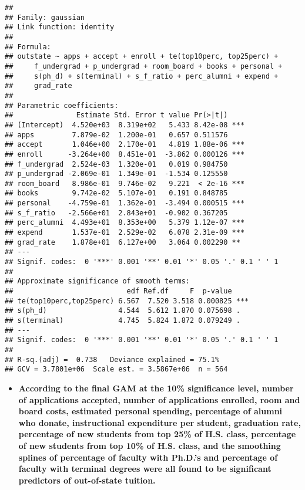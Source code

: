 \documentclass[
]{article}
\providecommand{\tightlist}{%
  \setlength{\itemsep}{0pt}\setlength{\parskip}{0pt}}
\begin{document}
\begin{verbatim}
## 
## Family: gaussian 
## Link function: identity 
## 
## Formula:
## outstate ~ apps + accept + enroll + te(top10perc, top25perc) + 
##     f_undergrad + p_undergrad + room_board + books + personal + 
##     s(ph_d) + s(terminal) + s_f_ratio + perc_alumni + expend + 
##     grad_rate
## 
## Parametric coefficients:
##               Estimate Std. Error t value Pr(>|t|)    
## (Intercept)  4.520e+03  8.319e+02   5.433 8.42e-08 ***
## apps         7.879e-02  1.200e-01   0.657 0.511576    
## accept       1.046e+00  2.170e-01   4.819 1.88e-06 ***
## enroll      -3.264e+00  8.451e-01  -3.862 0.000126 ***
## f_undergrad  2.524e-03  1.320e-01   0.019 0.984750    
## p_undergrad -2.069e-01  1.349e-01  -1.534 0.125550    
## room_board   8.986e-01  9.746e-02   9.221  < 2e-16 ***
## books        9.742e-02  5.107e-01   0.191 0.848785    
## personal    -4.759e-01  1.362e-01  -3.494 0.000515 ***
## s_f_ratio   -2.566e+01  2.843e+01  -0.902 0.367205    
## perc_alumni  4.493e+01  8.353e+00   5.379 1.12e-07 ***
## expend       1.537e-01  2.529e-02   6.078 2.31e-09 ***
## grad_rate    1.878e+01  6.127e+00   3.064 0.002290 ** 
## ---
## Signif. codes:  0 '***' 0.001 '**' 0.01 '*' 0.05 '.' 0.1 ' ' 1
## 
## Approximate significance of smooth terms:
##                           edf Ref.df     F  p-value    
## te(top10perc,top25perc) 6.567  7.520 3.518 0.000825 ***
## s(ph_d)                 4.544  5.612 1.870 0.075698 .  
## s(terminal)             4.745  5.824 1.872 0.079249 .  
## ---
## Signif. codes:  0 '***' 0.001 '**' 0.01 '*' 0.05 '.' 0.1 ' ' 1
## 
## R-sq.(adj) =  0.738   Deviance explained = 75.1%
## GCV = 3.7801e+06  Scale est. = 3.5867e+06  n = 564
\end{verbatim}

\begin{itemize}
\tightlist
\item
  \textbf{According to the final GAM at the 10\% significance level,
  number of applications accepted, number of applications enrolled, room
  and board costs, estimated personal spending, percentage of alumni who
  donate, instructional expenditure per student, graduation rate,
  percentage of new students from top 25\% of H.S. class, percentage of
  new students from top 10\% of H.S. class, and the smoothing splines of
  percentage of faculty with Ph.D.'s and percentage of faculty with
  terminal degrees were all found to be significant predictors of
  out-of-state tuition.}
\end{itemize}
\end{document}

